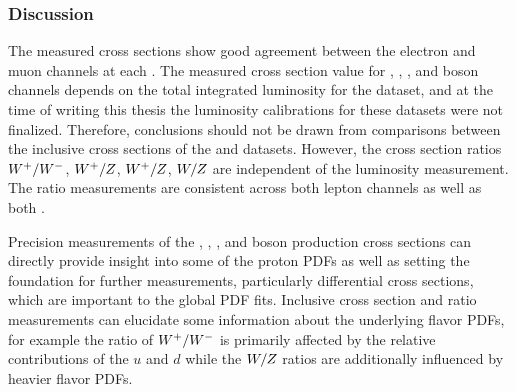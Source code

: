 \subsubsection{Discussion}
The measured cross sections show good agreement between the electron and muon channels at each \s. The measured cross section value for \Wp, \Wm, \W, and \Z boson channels depends on the total integrated luminosity for the dataset, and at the time of writing this thesis the luminosity calibrations for these datasets were not finalized. Therefore, conclusions should not be drawn from comparisons between the inclusive cross sections of the \sg and \sh datasets. However, the cross section ratios $W^+/W^-$, $W^+/Z$, $W^+/Z$, $W/Z$ are independent of the luminosity measurement. The ratio measurements are consistent across both lepton channels as well as both \s. 

Precision measurements of the \Wp, \Wm, \W, and \Z boson production cross sections can directly provide insight into some of the proton PDFs as well as setting the foundation for further measurements, particularly differential cross sections, which are important to the global PDF fits. Inclusive cross section and ratio measurements can elucidate some information about the underlying flavor PDFs, for example the ratio of $W^+/W^-$ is primarily affected by the relative contributions of the $u$ and $d$ while the $W/Z$ ratios are additionally influenced by heavier flavor PDFs.

